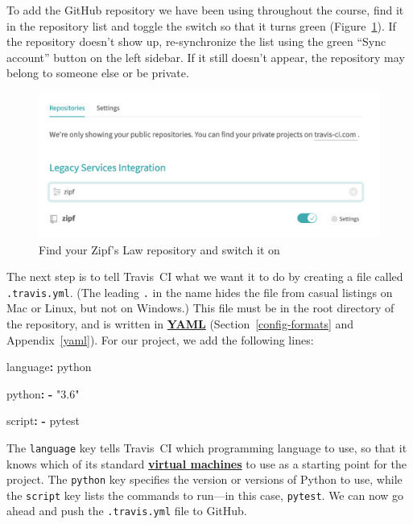 \documentclass[
]{krantz}
\makeatletter
\newenvironment{Shaded}{\begin{snugshade}}{\end{snugshade}}
\newcommand{\AttributeTok}[1]{\textcolor[rgb]{0.77,0.63,0.00}{#1}}
\newcommand{\FunctionTok}[1]{\textcolor[rgb]{0.00,0.00,0.00}{#1}}
\newcommand{\KeywordTok}[1]{\textcolor[rgb]{0.13,0.29,0.53}{\textbf{#1}}}
\newcommand{\StringTok}[1]{\textcolor[rgb]{0.31,0.60,0.02}{#1}}
\newenvironment{kframe}{%
\medskip{}
\setlength{\fboxsep}{.8em}
 \def\at@end@of@kframe{}%
 \ifinner\ifhmode%
  \def\at@end@of@kframe{\end{minipage}}%
  \begin{minipage}{\columnwidth}%
 \fi\fi%
 \def\FrameCommand##1{\hskip\@totalleftmargin \hskip-\fboxsep
 \colorbox{shadecolor}{##1}\hskip-\fboxsep
     \hskip-\linewidth \hskip-\@totalleftmargin \hskip\columnwidth}%
 \MakeFramed {\advance\hsize-\width
   \@totalleftmargin\z@ \linewidth\hsize
   \@setminipage}}%
 {\par\unskip\endMakeFramed%
 \at@end@of@kframe}
\renewenvironment{Shaded}{\begin{kframe}}{\end{kframe}}
\newcommand{\gref}[2]{\hyperlink{#2}{\textbf{#1}}}
\makeatother
\begin{document}
To add the GitHub repository we have been using throughout the course,
find it in the repository list
and toggle the switch so that it turns green
(Figure~\ref{fig:testing-list-repos}).
If the repository doesn't show up,
re-synchronize the list using the green ``Sync account'' button on the left sidebar.
If it still doesn't appear,
the repository may belong to someone else or be private.

\begin{figure}

{\centering \includegraphics[width=0.5\linewidth]{figures/testing/travis-list-repos} 

}

\caption{Find your Zipf's Law repository and switch it on}\label{fig:testing-list-repos}
\end{figure}

The next step is to tell Travis~CI what we want it to do
by creating a file called \texttt{.travis.yml}.
(The leading \texttt{.} in the name hides the file from casual listings on Mac or Linux,
but not on Windows.)
This file must be in the root directory of the repository,
and is written in \gref{YAML}{yaml}
(Section~\ref{config-formats} and Appendix~\ref{yaml}).
For our project,
we add the following lines:

\begin{Shaded}
\begin{Highlighting}[]
\FunctionTok{language}\KeywordTok{:}\AttributeTok{ python}

\FunctionTok{python}\KeywordTok{:}
\KeywordTok{{-}}\AttributeTok{ }\StringTok{"3.6"}

\FunctionTok{script}\KeywordTok{:}
\KeywordTok{{-}}\AttributeTok{ pytest}
\end{Highlighting}
\end{Shaded}

The \texttt{language} key tells Travis~CI which programming language to use,
so that it knows which of its standard \gref{virtual machines}{virtual\_machine} to use
as a starting point for the project.
The \texttt{python} key specifies the version or versions of Python to use,
while the \texttt{script} key lists the commands to run---in this case, \texttt{pytest}.
We can now go ahead and push the \texttt{.travis.yml} file to GitHub.
\end{document}
